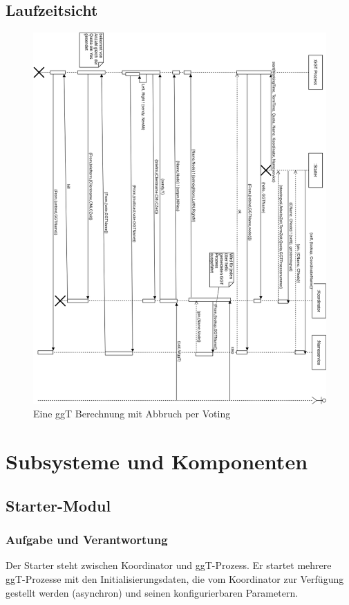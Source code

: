 \documentclass{article}
\begin{document}
\subsection{Laufzeitsicht}
\begin{figure}[H]
    \centering
    \includegraphics[width=1.0\textwidth]{sequence-diagram.png}
    \caption[seq-dia]{Eine ggT Berechnung mit Abbruch per Voting}
    \label{fig:seq-diagram}
\end{figure}

\newpage

\section{Subsysteme und Komponenten}

\subsection{Starter-Modul}
\subsubsection{Aufgabe und Verantwortung}
Der Starter steht zwischen Koordinator und ggT-Prozess. Er startet mehrere ggT-Prozesse mit den Initialisierungsdaten,
die vom Koordinator zur Verfügung gestellt werden (asynchron) und seinen konfigurierbaren Parametern.
\end{document}
